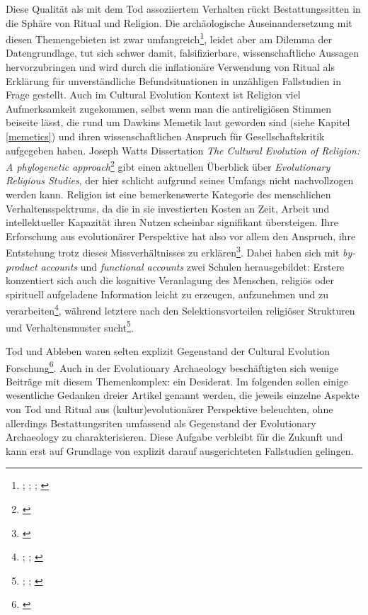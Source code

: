 \documentclass[openany,twoside,twocolumn]{book}
\let\rmarkdownfootnote\footnote%
\def\footnote{\protect\rmarkdownfootnote}
\begin{document}
Diese Qualität als mit dem Tod assoziiertem Verhalten rückt
Bestattungssitten in die Sphäre von Ritual und Religion. Die
archäologische Auseinandersetzung mit diesen Themengebieten ist zwar
umfangreich\footnote{\textcite{bertemes_archaeology_2001};
  \textcite{chapman_archaeology_1981};
  \textcite{insoll_archaeology_2004};
  \textcite{renfrew_archaeology_1994}}, leidet aber am Dilemma der
Datengrundlage, tut sich schwer damit, falsifizierbare,
wissenschaftliche Aussagen hervorzubringen und wird durch die
inflationäre Verwendung von Ritual als Erklärung für unverständliche
Befundsituationen in unzähligen Fallstudien in Frage gestellt. Auch im
Cultural Evolution Kontext ist Religion viel Aufmerksamkeit zugekommen,
selbst wenn man die antireligiösen Stimmen beiseite lässt, die rund um
Dawkins Memetik laut geworden sind (siehe Kapitel \ref{memetics}) und
ihren wissenschaftlichen Anspruch für Gesellschaftskritik aufgegeben
haben. Joseph Watts Dissertation \emph{The Cultural Evolution of
Religion: A phylogenetic approach}\footnote{\textcite{watts_cultural_2016}}
gibt einen aktuellen Überblick über \emph{Evolutionary Religious
Studies}, der hier schlicht aufgrund seines Umfangs nicht nachvollzogen
werden kann. Religion ist eine bemerkenswerte Kategorie des menschlichen
Verhaltensspektrums, da die in sie investierten Kosten an Zeit, Arbeit
und intellektueller Kapazität ihren Nutzen scheinbar signifikant
übersteigen. Ihre Erforschung aus evolutionärer Perspektive hat also vor
allem den Anspruch, ihre Entstehung trotz dieses Missverhältnisses zu
erklären\footnote{\textcite{wilson_evolutionary_2012-1}}. Dabei haben
sich mit \emph{by-product accounts} und \emph{functional accounts} zwei
Schulen herausgebildet: Erstere konzentiert sich auch die kognitive
Veranlagung des Menschen, religiös oder spirituell aufgeladene
Information leicht zu erzeugen, aufzunehmen und zu verarbeiten\footnote{\textcite{barrett_exploring_2000};
  \textcite{baumard_explaining_2013}; \textcite{boyer_evolutionary_2008}},
während letztere nach den Selektionsvorteilen religiöser Strukturen und
Verhaltensmuster sucht\footnote{\textcite{norenzayan_cultural_2016};
  \textcite{sosis_adaptationist-byproduct_2009};
  \textcite{wilson_darwins_2002}}.

Tod und Ableben waren selten explizit Gegenstand der Cultural Evolution
Forschung\footnote{\textcite{falger_cultural_2003}}. Auch in der
Evolutionary Archaeology beschäftigten sich wenige Beiträge mit diesem
Themenkomplex: ein Desiderat. Im folgenden sollen einige wesentliche
Gedanken dreier Artikel genannt werden, die jeweils einzelne Aspekte von
Tod und Ritual aus (kultur)evolutionärer Perspektive beleuchten, ohne
allerdings Bestattungsriten umfassend als Gegenstand der Evolutionary
Archaeology zu charakterisieren. Diese Aufgabe verbleibt für die Zukunft
und kann erst auf Grundlage von explizit darauf ausgerichteten
Fallstudien gelingen.
\end{document}
